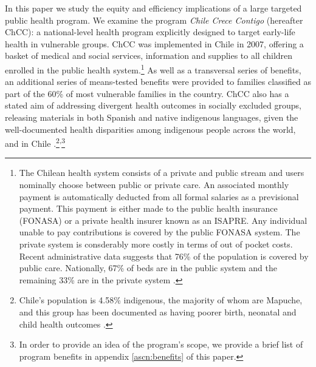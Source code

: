 \documentclass[12pt]{article}
\begin{document}
\begin{spacing}{1.4}
In this paper we study the equity and efficiency implications of a large
targeted public health program.  We examine the program \emph{Chile Crece
  Contigo} (hereafter ChCC): a national-level health program 
explicitly designed to target early-life health in vulnerable groups.
ChCC was implemented in Chile in 2007, offering a basket of medical
and social services, information and supplies to all children enrolled
in the public health system.\footnote{The Chilean health system consists
  of a private and public stream and users nominally choose between public or
  private care. An associated monthly payment is automatically deducted
  from all formal salaries as a previsional payment.  This payment is
  either made to the public health insurance (FONASA) or a private health
  insurer known as an ISAPRE.  Any individual unable to pay contributions
  is covered by the public FONASA system.  The private system is
  consderably more costly in terms of out of pocket costs.  Recent
  administrative data suggests that 76\% of the population is covered
  by public care.  Nationally, 67\% of beds are in the public system and
  the remaining 33\% are in the private system \citep{DEIS2016}.}  As well
as a transversal series of benefits, an additional series of means-tested
benefits were provided to families classified as part of the 60\% of most
vulnerable families in the country.  ChCC also has a stated
aim of addressing divergent health outcomes in socially excluded groups,
releasing materials in both Spanish and native indigenous languages, given
the well-documented health disparities among indigenous people across the
world, and in Chile \citep{Andersonetal2016}.\footnote{Chile's population
  is 4.58\% indigenous, the majority of whom are Mapuche, and this group
  has been documented as having poorer birth, neonatal and child health
  outcomes \citep{Andersonetal2016}.}\textsuperscript{,}\footnote{In order
  to provide an idea of the program's scope, we provide a brief list of
  program benefits in appendix \ref{ascn:benefits} of this paper.}


\end{spacing}
\end{document}
